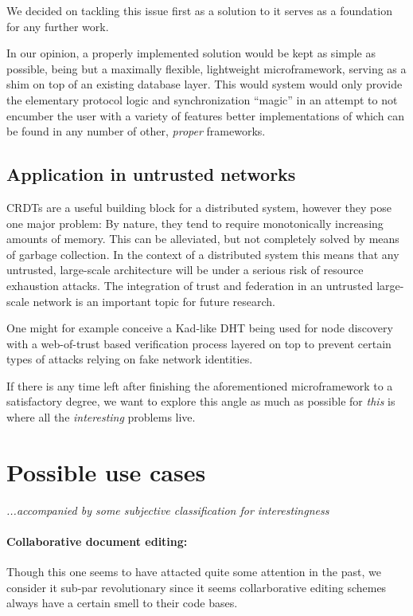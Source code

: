 \documentclass[12pt,a4paper,notitlepage]{article}
\begin{document}
We decided on tackling this issue first as a solution to it serves as a foundation for any further work.

In our opinion, a properly implemented solution would be kept as simple as possible, being but a maximally flexible,
lightweight microframework, serving as a shim on top of an existing database layer. This would system would only provide
the elementary protocol logic and synchronization ``magic'' in an attempt to not encumber the user with a variety of
features better implementations of which can be found in any number of other, \emph{proper} frameworks.

\subsection{Application in untrusted networks}
CRDTs are a useful building block for a distributed system, however they pose one major problem: By nature, they tend to
require monotonically increasing amounts of memory. This can be alleviated, but not completely solved by means of
garbage collection. In the context of a distributed system this means that any untrusted, large-scale architecture will
be under a serious risk of resource exhaustion attacks. The integration of trust and federation in an untrusted
large-scale network is an important topic for future research.

One might for example conceive a Kad-like DHT being used for node discovery with a web-of-trust based verification
process layered on top to prevent certain types of attacks relying on fake network identities.

If there is any time left after finishing the aforementioned microframework to a satisfactory degree, we want to explore
this angle as much as possible for \emph{this} is where all the \emph{interesting} problems live.

\section{Possible use cases}

\emph{...accompanied by some subjective classification for interestingness}

\paragraph{Collaborative document editing:} Though this one seems to have attacted quite some attention in the past, we
consider it sub-par revolutionary since it seems collarborative editing schemes always have a certain smell to their
code bases.
\end{document}
